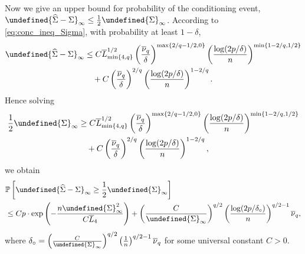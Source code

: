 \documentclass[10pt,a4paper]{amsart}
\theoremstyle{plain}
\theoremstyle{remark}
\def\hat#1{\widehat{#1}}
\def\bar#1{\overline{#1}}
\let\norm\undefined %
\DeclarePairedDelimiter\norm{\lVert}{\rVert}
\renewcommand{\Pr}{\mathbb{P}}  %
\begin{document}
\smallskip
Now we give an upper bound for probability of the conditioning event, $\norm{\hat\Sigma - \Sigma}_\infty \leq \frac{1}{2} \norm{\Sigma}_\infty$.
According to \cref{eq:conc_ineq_Sigma}, with probability at least $1 - \delta$,
\begin{equation*}
\begin{aligned}
    \norm{\hat\Sigma - \Sigma}_\infty 
    & \leq C \bar{L}_{\min\{4, q\}}^{1/2} \left(\frac{\bar{\nu}_{q}}{\delta} \right)^{\max\{2/q-1/2,0\}}
    \left(\frac{\log(2p/\delta)}{n}\right)^{\min\{1-2/q, 1/2\}} \\
    & \quad + C \left(\frac{\bar{\nu}_{q}}{\delta} \right)^{2/q} \left(\frac{\log(2p/\delta)}{n}\right)^{1-2/q}. \\
\end{aligned}
\end{equation*}
Hence solving 
\begin{equation*}
\begin{aligned}
    \frac{1}{2} \norm{\Sigma}_\infty 
    & \geq C \bar{L}_{\min\{4, q\}}^{1/2} \left(\frac{\bar{\nu}_{q}}{\delta} \right)^{\max\{2/q-1/2,0\}}
    \left(\frac{\log(2p/\delta)}{n}\right)^{\min\{1-2/q, 1/2\}} \\
    & \quad + C \left(\frac{\bar{\nu}_{q}}{\delta} \right)^{2/q} \left(\frac{\log(2p/\delta)}{n}\right)^{1-2/q}, \\
\end{aligned}
\end{equation*}
we obtain
\begin{equation*}
\begin{aligned}
    & \Pr\left[
        \norm{\hat\Sigma - \Sigma}_\infty \geq \frac{1}{2} \norm{\Sigma}_\infty
    \right] \\
    & \leq C p \cdot \exp\left( - \frac{n \norm{\Sigma}_\infty^2}{C \bar{L}_4} \right) 
    + \left( \frac{C}{\norm{\Sigma}_\infty} \right)^{q/2} \left( \frac{\log(2p/\delta_\circ)}{n} \right)^{q/2 - 1} \bar\nu_q,
\end{aligned}
\end{equation*}
where $\delta_\circ = \left( \frac{C}{\norm{\Sigma}_\infty} \right)^{q/2} \left( \frac{1}{n} \right)^{q/2 - 1} \bar\nu_q$ for some universal constant $C > 0$.
\end{document}
